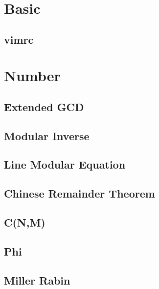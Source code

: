\documentclass[10pt,twocolumn,oneside]{article}
\begin{document}
    \pagestyle{fancy}
    \fancyfoot{}
    \fancyhead[R]{\thepage}
    \renewcommand{\headrulewidth}{0.4pt}
    \renewcommand{\contentsname}{Codebook} 

    \scriptsize
    \tableofcontents

    \newpage

    \section{Basic}
    \subsection{vimrc}
    
    \newpage


    \section{Number}
    \subsection{Extended GCD}
    
    \subsection{Modular Inverse}
    
    \subsection{Line Modular Equation}
    
    \subsection{Chinese Remainder Theorem}
    
    \subsection{C(N,M)}
    
    \subsection{Phi}
    
    \subsection{Miller Rabin}
    
\end{document}
